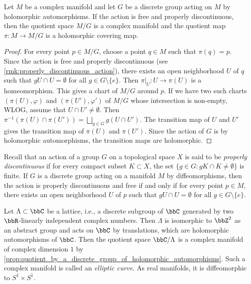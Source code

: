 \begin{proposition}\label{prop:quotient_by_a_discrete_group_of_holomorphic_automorphisms}
	Let \(M\) be a complex manifold and let \(G\) be a discrete group acting on \(M\) by holomorphic automorphisms.
	If the action is free and properly discontinuous, then the quotient space \(M/G\) is a complex manifold and the quotient map \(\pi: M\to M/G\) is a holomorphic covering map.
\end{proposition}
\begin{proof}
	For every point \(p\in M/G\), choose a point \(q\in M\) such that \(\pi(q) = p\).
	Since the action is free and properly discontinuous (see \cref{rmk:properly_discontinuous_action}), there exists an open neighborhood \(U\) of \(q\) such that \(gU \cap U = \emptyset\) for all \(g\in G\setminus \{e\}\).
	Then \(\pi|_U: U \to \pi(U)\) is a homeomorphism.
	This gives a chart of \(M/G\) around \(p\).
	If we have two such charts \((\pi(U),\varphi)\) and \((\pi(U'),\varphi')\) of \(M/G\) whose intersection is non-empty, WLOG, assume that \(U \cap U' \neq \emptyset\).
	Then \(\pi^{-1}(\pi(U) \cap \pi(U')) = \bigsqcup_{g\in G} g(U \cap U')\).
	The transition map of \(U\) and \(U'\) gives the transition map of \(\pi(U)\) and \(\pi(U')\).
	Since the action of \(G\) is by holomorphic automorphisms, the transition maps are holomorphic.
\end{proof}
\begin{remark}\label{rmk:properly_discontinuous_action}
	Recall that an action of a group \(G\) on a topological space \(X\) is said to be \emph{properly discontinuous} if for every compact subset \(K \subset X\), the set \(\{g\in G: gK \cap K \neq \emptyset\}\) is finite.
	If \(G\) is a discrete group acting on a manifold \(M\) by diffeomorphisms,
	then the action is properly discontinuous and free if and only if for every point \(p\in M\),
	there exists an open neighborhood \(U\) of \(p\) such that \(gU \cap U = \emptyset\) for all \(g\in G\setminus \{e\}\).
\end{remark}

\begin{example}\label{eg:elliptic_curves_as_complex_manifolds_by_quotient_of_C}
	Let \(\Lambda \subset \bbC\) be a lattice, i.e., a discrete subgroup of \(\bbC\) generated by two \(\bbR\)-linearly independent complex numbers.
	Then \(\Lambda\) is isomorphic to \(\bbZ^2\) as an abstract group and acts on \(\bbC\) by translations, which are holomorphic automorphisms of \(\bbC\).
	Then the quotient space \(\bbC/\Lambda\) is a complex manifold of complex dimension \(1\) by \cref{prop:quotient_by_a_discrete_group_of_holomorphic_automorphisms}.
	Such a complex manifold is called an \emph{elliptic curve}.
	As real manifolds, it is diffeomorphic to \(S^1 \times S^1\).
\end{example}

